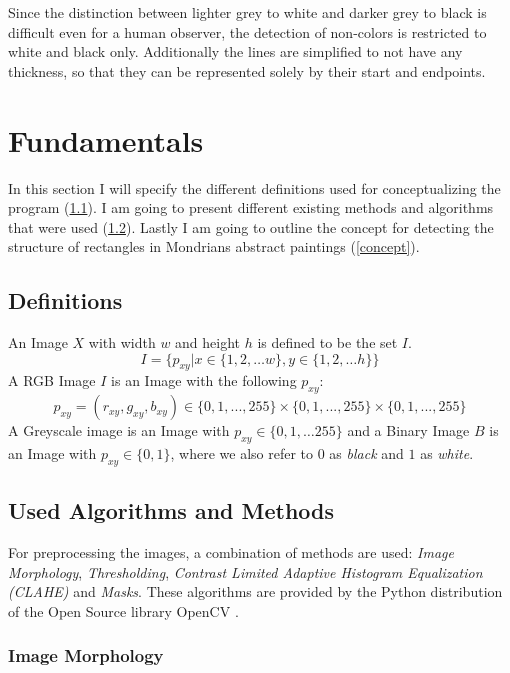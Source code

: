 \documentclass[serif,article,noparskip]{agse-thesis}
\begin{document}
Since the distinction between lighter grey to white and darker grey to black is
difficult even for a human observer, the detection of non-colors is restricted
to white and black only. Additionally the lines are simplified to not have any
thickness, so that they can be represented solely by their start and endpoints.

\section{Fundamentals} \label{fundamentals}

In this section I will specify the different definitions used for
conceptualizing the program (\ref{definitions}). I am going to present
different existing methods and algorithms that were used (\ref{used}). Lastly I
am going to outline the concept for detecting the structure of rectangles in
Mondrians abstract paintings (\ref{concept}).

\subsection{Definitions} \label{definitions}

An Image $X$ with width $w$ and height $h$ is defined to be the set $I$. $$I =
\{p_{xy} | x \in \{1,2, \dots w\}, y \in \{1,2, \dots h\} \}$$ A RGB Image $I$
is an Image with the following  $p_{xy}$: $$p_{xy} = (r_{xy}, g_{xy}, b_{xy})
\in \{0,1,...,255\} \times \{0,1,...,255\} \times\{0,1,...,255\}$$ A Greyscale
image is an Image with $p_{xy} \in \{0,1, \dots 255\}$ and a Binary Image $B$ is
an Image with $p_{xy} \in \{0,1\}$, where we also refer to $0$ as \textit{black}
and $1$ as \textit{white}.

\subsection{Used Algorithms and Methods} \label{used}

For preprocessing the images, a combination of methods are used: \textit{Image
Morphology}, \textit{Thresholding}, \textit{Contrast Limited Adaptive Histogram
Equalization (CLAHE)} and \textit{Masks}. These algorithms are provided by the
Python distribution of the Open Source library OpenCV \cite{opencv_library}.

\subsubsection{Image Morphology}
\end{document}
